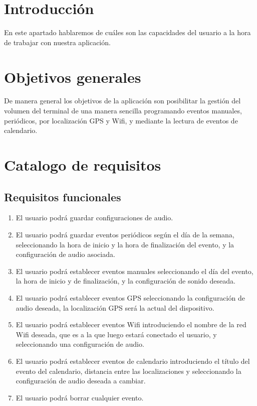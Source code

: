 
\section{Introducción}
En este apartado hablaremos de cuáles son las capacidades del usuario a la hora de trabajar con nuestra aplicación.

\section{Objetivos generales}
De manera general los objetivos de la aplicación son posibilitar la gestión del volumen del terminal de una manera sencilla programando eventos manuales, periódicos, por localización GPS y Wifi, y mediante la lectura de eventos de calendario.

\section{Catalogo de requisitos}
\subsection{Requisitos funcionales}
\begin{enumerate}
	\item El usuario podrá guardar configuraciones de audio.
	\item El usuario podrá guardar eventos periódicos según el día de la semana, seleccionando la hora de inicio y la hora de finalización del evento, y la configuración de audio asociada.
	\item El usuario podrá establecer eventos manuales seleccionando el día del evento, la hora de inicio y de finalización, y la configuración de sonido deseada.
	\item El usuario podrá establecer eventos GPS seleccionando la configuración de audio deseada, la localización GPS será la actual del dispositivo.
	\item El usuario podrá establecer eventos Wifi introduciendo el nombre de la red Wifi deseada, que es a la que luego estará conectado el usuario, y seleccionando una configuración de audio.
	\item El usuario podrá establecer eventos de calendario introduciendo el título del evento del calendario, distancia entre las localizaciones y seleccionando la configuración de audio deseada a cambiar.
	\item El usuario podrá borrar cualquier evento.
\end{enumerate}

